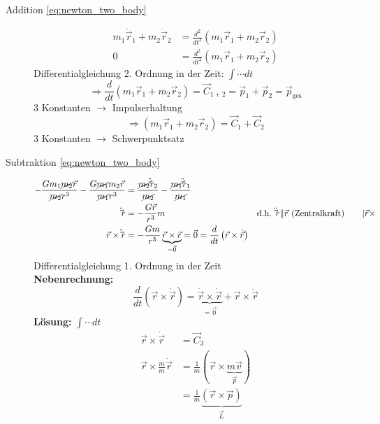 \begin{description}
    \item[Addition \autoref{eq:newton_two_body}]
        \begin{align*}
            m_1\ddot\vec{r}_1 + m_2\ddot\vec{r}_2 &= \frac{d^2}{dt^2} (m_1 \vec{r}_1 + m_2 \vec{r}_2) \\
                                      0 &= \frac{d^2}{dt^2} (m_1 \vec{r}_1 + m_2 \vec{r}_2)
        \end{align*}
        Differentialgleichung 2. Ordnung in der Zeit: $\int \cdots dt$
        \[ \Rightarrow \frac{d}{dt} (m_1 \vec{r}_1 + m_2 \vec{r}_2) = \vec{C}_{1+2} = \vec{p}_1 + \vec{p}_2 = \vec{p}_{\text{ges}} \]
        3 Konstanten $\rightarrow$ Impulserhaltung
        \[ \Rightarrow (m_1 \vec{r}_1 + m_2 \vec{r}_2) = \vec{C}_1 + \vec{C}_2 \]
        3 Konstanten $\rightarrow$ Schwerpunktsatz
    \item[Subtraktion \autoref{eq:newton_two_body}]
        \begin{align*}
            -\frac{G m_1 \cancel{m_2} \vec r}{\cancel{m_2} r^3} - \frac{G \cancel{m_1} m_2 \vec r}{\cancel{m_1} r^3} &= \frac{\cancel{m_2} \ddot \vec{r}_2}{\cancel{m_2}} - \frac{\cancel{m_1} \ddot \vec{r}_1}{\cancel{m_1}} \\
            \ddot \vec{r} &= - \frac{G \vec r}{r^3} m && \text{d.h. $\ddot \vec{r} \| \vec r$ (Zentralkraft)} \tag*{$| \vec r \times$}\\
            \vec r \times \ddot \vec{r} &= - \frac{Gm}{r^3} \underbrace{\vec r \times \vec r}_{= \vec 0} = \vec 0 = \frac{d}{dt} \left(\vec r \times \dot{\vec{r}}\right)
        \end{align*}
        Differentialgleichung 1. Ordnung in der Zeit\\[1em]
        \color{OliveGreen}
        \textbf{Nebenrechnung:}
        \[ \frac{d}{dt} (\vec r \times \dot{\vec{r}}) = \underbrace{\dot{\vec{r}} \times \dot{\vec{r}}}_{= \vec 0} + \vec r \times \ddot \vec{r} \tag{Produktregel} \]
        \color{black}
        \textbf{Lösung:} $\int \cdots dt$
        \begin{align*}
            \vec r \times \dot{\vec{r}}             &= \vec{C}_3 \\
            \vec r \times \frac{m}{m} \dot{\vec{r}} &= \frac{1}{m} (\vec r \times \underbrace{m \vec v}_{\vec p})\\
                                                    &= \frac{1}{m} \underbrace{(\vec r \times \vec p)}_{\vec L} \tag{$\vec L$: Drehimpuls}
        \end{align*}

\end{description}
